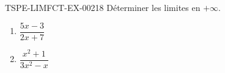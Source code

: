 \begin{exercice}{TSPE-LIMFCT-EX-002}{1}{8}
Déterminer les limites en $+\infty$.
\begin{enumerate}
  \item $\dfrac{5x - 3}{2x + 7}$
  \item $\dfrac{x^2 + 1}{3x^2 - x}$
\end{enumerate}
\end{exercice}
